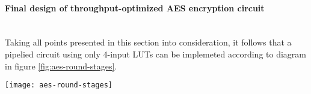 \paragraph{Final design of throughput-optimized AES encryption circuit}\mbox{}\\
Taking all points presented in this section into consideration, it follows that a pipelied circuit using only 4-input LUTs can be implemeted according to diagram in figure \ref{fig:aes-round-stages}.

\begin{sidewaysfigure}[p]
\centering
\texttt{[image: aes-round-stages]}
\caption{Throughput optimized AES encryption round pipeline}
\label{fig:aes-round-stages}
\end{sidewaysfigure}

